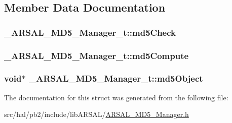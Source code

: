 \subsection{Member Data Documentation}
\subsubsection[{\texorpdfstring{md5\+Check}{md5Check}}]{ \+\_\+\+A\+R\+S\+A\+L\+\_\+\+M\+D5\+\_\+\+Manager\+\_\+t\+::md5\+Check}\hypertarget{struct___a_r_s_a_l___m_d5___manager__t_a99d59e83379a594ae29d6791a87cf663}{}\label{struct___a_r_s_a_l___m_d5___manager__t_a99d59e83379a594ae29d6791a87cf663}
\subsubsection[{\texorpdfstring{md5\+Compute}{md5Compute}}]{ \+\_\+\+A\+R\+S\+A\+L\+\_\+\+M\+D5\+\_\+\+Manager\+\_\+t\+::md5\+Compute}\hypertarget{struct___a_r_s_a_l___m_d5___manager__t_a11253beda827f985183c1b9bb2cd8cd1}{}\label{struct___a_r_s_a_l___m_d5___manager__t_a11253beda827f985183c1b9bb2cd8cd1}
\subsubsection[{\texorpdfstring{md5\+Object}{md5Object}}]{\setlength{\rightskip}{0pt plus 5cm}void$\ast$ \+\_\+\+A\+R\+S\+A\+L\+\_\+\+M\+D5\+\_\+\+Manager\+\_\+t\+::md5\+Object}\hypertarget{struct___a_r_s_a_l___m_d5___manager__t_ac5435ad98781372d4501125712cad2ef}{}\label{struct___a_r_s_a_l___m_d5___manager__t_ac5435ad98781372d4501125712cad2ef}


The documentation for this struct was generated from the following file\+:\begin{DoxyCompactItemize}
\item 
src/hal/pb2/include/lib\+A\+R\+S\+A\+L/\hyperlink{_a_r_s_a_l___m_d5___manager_8h}{A\+R\+S\+A\+L\+\_\+\+M\+D5\+\_\+\+Manager.\+h}\end{DoxyCompactItemize}
